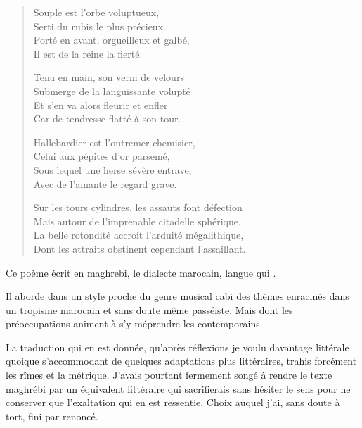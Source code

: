 \begin{verse}
Souple est l’orbe voluptueux,\\
Serti du rubis le plus précieux.\\
Porté en avant, orgueilleux et galbé,\\
Il est de la reine la fierté.

Tenu en main, son verni de velours\\
Submerge de la languissante volupté\\
Et s’en va alors fleurir et enfler\\
Car de tendresse flatté à son tour.

Hallebardier est l’outremer chemisier,\\
Celui aux pépites d’or parsemé,\\
Sous lequel une herse sévère entrave,\\
Avec de l’amante le regard grave.

Sur les tours cylindres, les assauts font défection\\
Mais autour de l’imprenable citadelle sphérique,\\
La belle rotondité accroit l’arduité mégalithique,\\
Dont les attraits obstinent cependant l’assaillant.
\end{verse}


\begin{prose}
Ce poème écrit en maghrebi, le dialecte marocain, langue qui .

Il aborde dans un style proche du genre musical cabi  des thèmes enracinés dans un tropisme marocain et sans doute même passéiste. Mais dont les préoccupations animent à s’y méprendre les contemporains.

La traduction qui en est donnée, qu’après réﬂexions je voulu davantage littérale quoique s’accommodant de quelques adaptations plus littéraires, trahis forcément les rîmes et la métrique.
J’avais pourtant fermement songé à rendre le texte maghrébi par un équivalent littéraire qui sacriﬁerais sans hésiter le sens pour ne conserver que l’exaltation qui en est ressentie. Choix auquel j’ai, sans doute à tort, ﬁni par renoncé.
\end{prose}

